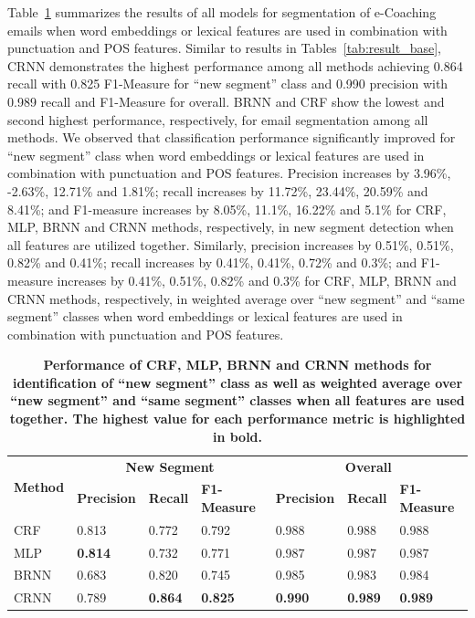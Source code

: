 \documentclass{amia}
\begin{document}
Table~\ref{tab:result_weighted_avg} summarizes the results of all models for segmentation of e-Coaching emails when word embeddings or lexical features are used in combination with punctuation and POS features. Similar to results in Tables~\ref{tab:result_base}, CRNN demonstrates the highest performance among all methods achieving 0.864 recall with 0.825 F1-Measure for ``new segment'' class and 0.990 precision with 0.989 recall and F1-Measure for overall. BRNN and CRF show the lowest and second highest performance, respectively, for email segmentation among all methods. We observed that classification performance significantly improved for ``new segment'' class when word embeddings or lexical features are used in combination with punctuation and POS features. Precision increases by 3.96\%, -2.63\%, 12.71\% and 1.81\%; recall increases by 11.72\%, 23.44\%, 20.59\% and 8.41\%; and F1-measure increases by 8.05\%, 11.1\%, 16.22\% and 5.1\% for CRF, MLP, BRNN and CRNN methods, respectively, in new segment detection when all features are utilized together. Similarly, precision increases by 0.51\%, 0.51\%, 0.82\% and 0.41\%; recall increases by 0.41\%, 0.41\%, 0.72\% and 0.3\%; and F1-measure increases by 0.41\%, 0.51\%, 0.82\% and 0.3\% for CRF, MLP, BRNN and CRNN methods, respectively, in weighted average over ``new segment'' and ``same segment'' classes when word embeddings or lexical features are used in combination with punctuation and POS features.\\

\begin{table}[ht]
\centering
\caption{\textbf{Performance of CRF, MLP, BRNN and CRNN methods for identification of ``new segment'' class as well as weighted average over ``new segment'' and ``same segment'' classes when all features are used together. The highest value for each performance metric
is highlighted in bold.}}
\label{tab:result_weighted_avg}
 \begin{tabular}{|l|l|l|l|l|l|l|}
  \hline
   \multirow{2}{*}{\textbf{Method}} & \multicolumn{3}{|c|}{\textbf{New Segment}} & \multicolumn{3}{|c|}{\textbf{Overall}} \\\cline{2-7}
   & \textbf{Precision}  & \textbf{Recall} & \textbf{F1-Measure} & \textbf{Precision}  & \textbf{Recall} & \textbf{F1-Measure} \\ \hline    
 CRF & 0.813 & 0.772 & 0.792 & 0.988 & 0.988 & 0.988 \\ \hline
 MLP & \textbf{0.814} & 0.732 & 0.771 & 0.987 & 0.987 & 0.987 \\ \hline
 BRNN & 0.683 & 0.820 & 0.745 & 0.985 & 0.983 & 0.984 \\ \hline
 CRNN & 0.789 & \textbf{0.864} & \textbf{0.825} & \textbf{0.990} & \textbf{0.989} & \textbf{0.989} \\ \hline
  \end{tabular}
\end{table}              
\end{document}
